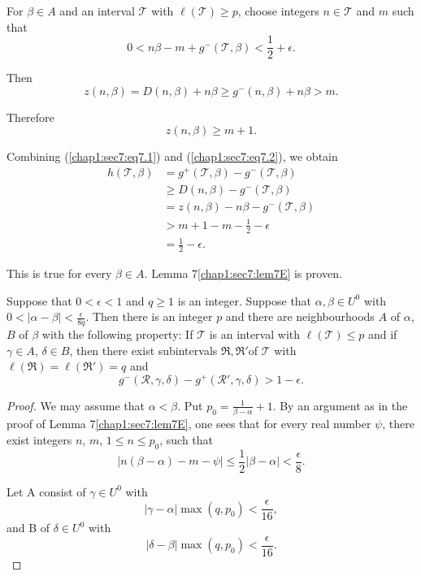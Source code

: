 For $\beta \in A$ and an interval $\mathscr{T}$ with $\ell (\mathscr{T}) \geq p$, choose integers $n \in \mathscr{T}$ and $m$ such that
\begin{equation*}
0 < n\beta - m + g^{-} (\mathscr{T}, \beta) < \frac{1}{2} + \epsilon.\tag{7.1} \label{chap1:sec7:eq7.1}
\end{equation*}

Then
$$
z(n, \beta) = D(n, \beta) + n\beta \geq g^{-} (n, \beta) + n\beta > m.
$$

Therefore
\begin{equation*}
z(n, \beta) \geq m+1.\tag{7.2} \label{chap1:sec7:eq7.2}
\end{equation*}

Combining (\ref{chap1:sec7:eq7.1}) and (\ref{chap1:sec7:eq7.2}), we obtain
\begin{align*}
h(\mathscr{T}, \beta) & = g^{+} (\mathscr{T}, \beta) - g^{-}(\mathscr{T}, \beta)\\
 & \geq D(n, \beta) - g^{-} (\mathscr{T}, \beta)\\
 & = z(n, \beta) - n\beta - g^{-} (\mathscr{T}, \beta)\\
 & > m + 1 - m - \frac{1}{2} - \epsilon\\
 & = \frac{1}{2} - \epsilon.
\end{align*}

This is true for every $\beta \in A$. Lemma 7\ref{chap1:sec7:lem7E} is proven.

\begin{lemma}\label{chap1:sec7:lem7F}
Suppose that $0 < \epsilon < 1$ and $q \geq 1$ is an integer. Suppose that $\alpha, \beta \in U^{0}$ with $0 < |\alpha - \beta| < \frac{\epsilon}{8q}$. Then there is an integer $p$ and there are neighbourhoods $A$ of $\alpha$, $B$ of $\beta$ with the following property: If $\mathscr{T}$ is an interval with $\ell (\mathscr{T}) \leq p$ and if $\gamma \in A$, $\delta \in B$, then there exist subintervals $\mathfrak{R}, \mathfrak{R}'$\pageoriginale of $\mathscr{T}$ with $\ell(\mathfrak{R}) = \ell(\mathfrak{R}') = q$ and
$$
g^{-} (\mathscr{R}, \gamma, \delta) - g^{+} (\mathscr{R}', \gamma, \delta) > 1 - \epsilon.
$$
\end{lemma}

\begin{proof} 
We may assume that $\alpha < \beta$. Put $p_{0} = \frac{1}{\beta - \alpha} + 1$. By an argument as in the proof of Lemma 7\ref{chap1:sec7:lem7E}, one sees that for every real number $\psi$, there exist integers $n$, $m$, $1 \leq n \leq p_{0}$, such that
$$
|n(\beta - \alpha) - m -\psi| \leq \frac{1}{2} |\beta - \alpha| < \frac{\epsilon}{8}.
$$

Let A consist of $\gamma \in U^{0}$ with
$$
|\gamma - \alpha| \max (q, p_{0}) < \frac{\epsilon}{16},
$$
and B of $\delta \in U^{0}$ with
$$
|\delta - \beta| \max (q, p_{0}) < \frac{\epsilon}{16}. 
$$
\end{proof}

